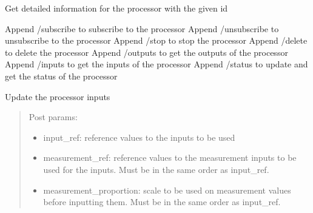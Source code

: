 \documentclass[letterpaper,10pt,english]{sphinxmanual}
\begin{document}
\begin{fulllineitems}
\label{\detokenize{src.processors:src.processors.views.processor_detail}}
Get detailed information for the processor with the given id

Append /subscribe to subscribe to the processor
Append /unsubscribe to unsubscribe to the processor
Append /stop to stop the processor
Append /delete to delete the processor
Append /outputs to get the outputs of the processor
Append /inputs to get the inputs of the processor
Append /status to update and get the status of the processor

\end{fulllineitems}


\begin{fulllineitems}
\label{\detokenize{src.processors:src.processors.views.processor_inputs_update}}
Update the processor inputs
\begin{quote}

Post params:
\begin{itemize}
\item {} 
input\_ref: reference values to the inputs to be used

\item {} 
measurement\_ref: reference values to the measurement inputs to be used for the inputs.
Must be in the same order as input\_ref.

\item {} 
measurement\_proportion: scale to be used on measurement values before inputting them.
Must be in the same order as input\_ref.

\end{itemize}
\end{quote}

\end{fulllineitems}

\end{document}
